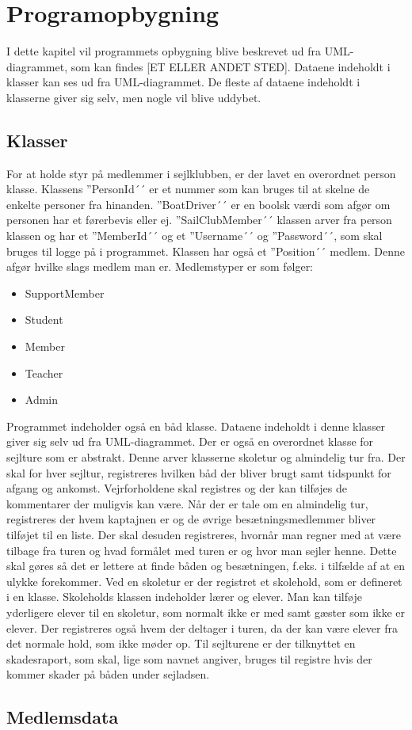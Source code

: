 \chapter{Programopbygning}

I dette kapitel vil programmets opbygning blive beskrevet ud fra UML-diagrammet, som kan findes [ET ELLER ANDET STED]. Dataene indeholdt i klasser kan ses ud fra UML-diagrammet. De fleste af dataene indeholdt i klasserne giver sig selv, men nogle vil blive uddybet.


\section{Klasser}

For at holde styr på medlemmer i sejlklubben, er der lavet en overordnet person klasse. Klassens ''PersonId´´ er et nummer som kan bruges til at skelne de enkelte personer fra hinanden. ''BoatDriver´´ er en boolsk værdi som afgør om personen har et førerbevis eller ej.
''SailClubMember´´ klassen arver fra person klassen og har et ''MemberId´´ og et ''Username´´ og ''Password´´, som skal bruges til logge på i programmet. Klassen har også et ''Position´´ medlem. Denne afgør hvilke slags medlem man er. Medlemstyper er som følger:

\begin{itemize}
\item SupportMember
\item Student
\item Member
\item Teacher
\item Admin
\end{itemize}

Programmet indeholder også en båd klasse. Dataene indeholdt i denne klasser giver sig selv ud fra UML-diagrammet.
Der er også en overordnet klasse for sejlture som er abstrakt. Denne arver klasserne skoletur og almindelig tur fra. Der skal for hver sejltur, registreres hvilken båd der bliver brugt samt tidspunkt for afgang og ankomst. Vejrforholdene skal registres og der kan tilføjes de kommentarer der muligvis kan være.
Når der er tale om en almindelig tur, registreres der hvem kaptajnen er og de øvrige besætningsmedlemmer bliver tilføjet til en liste. Der skal desuden registreres, hvornår man regner med at være tilbage fra turen og hvad formålet med turen er og hvor man sejler henne. Dette skal gøres så det er lettere at finde båden og besætningen, f.eks. i tilfælde af at en ulykke forekommer.
Ved en skoletur er der registret et skolehold, som er defineret i en klasse. Skoleholds klassen indeholder lærer og elever. Man kan tilføje yderligere elever til en skoletur, som normalt ikke er med samt gæster som ikke er elever. Der registreres også hvem der deltager i turen, da der kan være elever fra det normale hold, som ikke møder op.
Til sejlturene er der tilknyttet en skadesraport, som skal, lige som navnet angiver, bruges til registre hvis der kommer skader på båden under sejladsen. 


\section{Medlemsdata}

